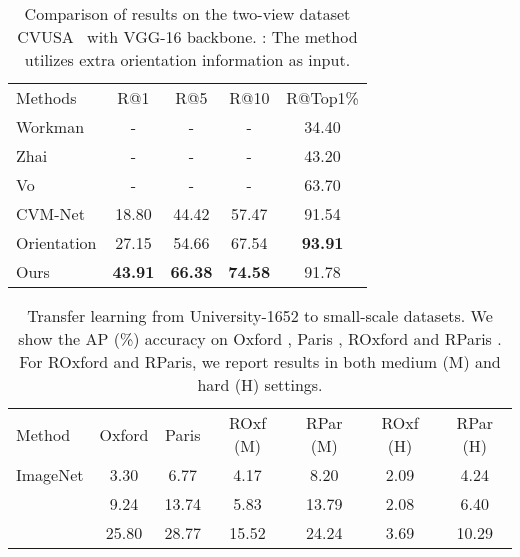 \documentclass[sigconf]{acmart}
\begin{document}
\setlength{\tabcolsep}{9pt}
\begin{table}
\small
\begin{center}
\begin{tabular}{l|cccc}
\hline
Methods  & R@1 & R@5 & R@10 & R@Top1\%\\
\shline
Workman \cite{workman2015wide} & - & - & - & 34.40 \\
Zhai \cite{zhai2017predicting} & - & - & - & 43.20 \\
Vo \cite{vo2016localizing} & - & - & - & 63.70 \\
CVM-Net \cite{hu2018cvm} & 18.80 & 44.42 & 57.47 & 91.54 \\
Orientation \cite{liu2019lending} & 27.15 & 54.66 & 67.54 & \textbf{93.91} \\
Ours  & \textbf{43.91} & \textbf{66.38} & \textbf{74.58} & 91.78 \\
\hline
\end{tabular}
\end{center}
\caption{ Comparison of results on the two-view dataset CVUSA~\cite{zhai2017predicting} with VGG-16 backbone. : The method utilizes extra orientation information as input.
}
\label{table:usa}
\end{table}

\setlength{\tabcolsep}{3pt}
\begin{table}
\small
\begin{center}
\begin{tabular}{l|c|c|c|c|c|c}
\hline
Method & Oxford	& Paris	& ROxf (M) & RPar (M) & ROxf (H) & RPar (H) \\
\shline
ImageNet & 3.30 & 6.77 & 4.17 & 8.20 & 2.09 & 4.24 \\
 & 9.24 & 13.74 & 5.83 & 13.79 & 2.08 & 6.40\\
 & 25.80 & 28.77 & 15.52 & 24.24 & 3.69 & 10.29\\
\hline
\end{tabular}
\end{center}
\caption{Transfer learning from University-1652 to small-scale datasets. We show the AP (\%) accuracy on Oxford \cite{philbin2007object}, Paris \cite{philbin2008lost}, ROxford and RParis \cite{RITAC18}. For ROxford and RParis, we report results in both medium (M) and hard (H) settings. }
\label{table:transfer}
\end{table}
\end{document}
